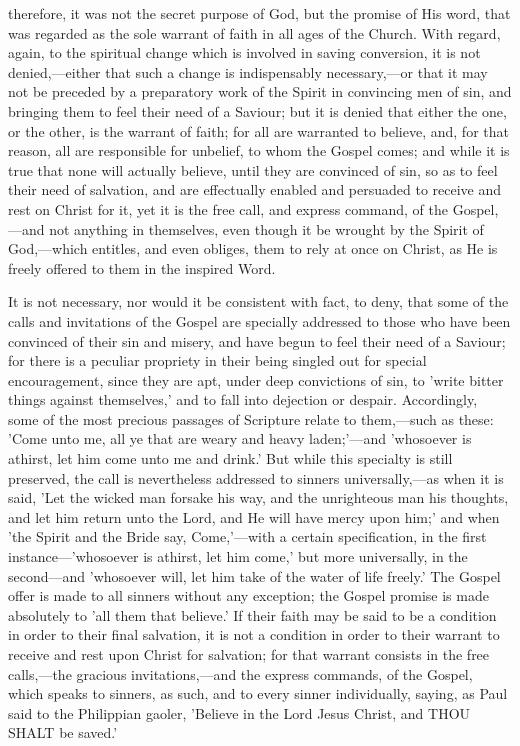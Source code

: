 \documentclass[
]{book}
\begin{document}
therefore, it was not the secret purpose of God, but the promise of His word, that was regarded as the sole warrant of faith in all ages of the Church. With regard, again, to the spiritual change which is involved in saving conversion, it is not denied,---either that such a change is indispensably necessary,---or that it may not be preceded by a preparatory work of the Spirit in convincing men of sin, and bringing them to feel their need of a Saviour; but it is denied that either the one, or the other, is the warrant of faith; for all are warranted to believe, and, for that reason, all are responsible for unbelief, to whom the Gospel comes; and while it is true that none will actually believe, until they are convinced of sin, so as to feel their need of salvation, and are effectually enabled and persuaded to receive and rest on Christ for it, yet it is the free call, and express command, of the Gospel,---and not anything in themselves, even though it be wrought by the Spirit of God,---which entitles, and even obliges, them to rely at once on Christ, as He is freely offered to them in the inspired Word.

It is not necessary, nor would it be consistent with fact, to deny, that some of the calls and invitations of the Gospel are specially addressed to those who have been convinced of their sin and misery, and have begun to feel their need of a Saviour; for there is a peculiar propriety in their being singled out for special encouragement, since they are apt, under deep convictions of sin, to 'write bitter things against themselves,' and to fall into dejection or despair. Accordingly, some of the most precious passages of Scripture relate to them,---such as these: 'Come unto me, all ye that are weary and heavy laden;'---and 'whosoever is athirst, let him come unto me and drink.' But while this specialty is still preserved, the call is nevertheless addressed to sinners universally,---as when it is said, 'Let the wicked man forsake his way, and the unrighteous man his thoughts, and let him return unto the Lord, and He will have mercy upon him;' and when 'the Spirit and the Bride say, Come,'---with a certain specification, in the first instance---'whosoever is athirst, let him come,' but more universally, in the second---and 'whosoever will, let him take of the water of life freely.' The Gospel offer is made to all sinners without any exception; the Gospel promise is made absolutely to 'all them that believe.' If their faith may be said to be a condition in order to their final salvation, it is not a condition in order to their warrant to receive and rest upon Christ for salvation; for that warrant consists in the free calls,---the gracious invitations,---and the express commands, of the Gospel, which speaks to sinners, as such, and to every sinner individually, saying, as Paul said to the Philippian gaoler, 'Believe in the Lord Jesus Christ, and THOU SHALT be saved.'
\end{document}
